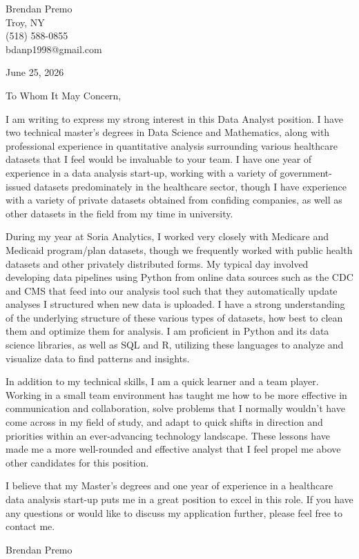 \documentclass[11pt]{article}
\begin{document}
\noindent
Brendan Premo \\
Troy, NY \\
(518) 588-0855 \\
bdanp1998@gmail.com

\vspace{1em}

\noindent
June 25, 2026

\vspace{1em}

\noindent
To Whom It May Concern,

\vspace{0.5em}


I am writing to express my strong interest in this Data Analyst position. 
I have two technical master's degrees in Data Science and Mathematics, along with professional experience in quantitative analysis 
surrounding various healthcare datasets that I feel would be invaluable to your team. I have one year of experience in a data analysis start-up, 
working with a variety of government-issued datasets predominately in the healthcare sector, though I have experience with a variety of private
datasets obtained from confiding companies, as well as other datasets in the field from my time in university.

During my year at Soria Analytics, I worked very closely with Medicare and Medicaid program/plan datasets, though we frequently worked with 
public health datasets and other privately distributed forms. My typical day involved developing data pipelines using Python from online data sources such 
as the CDC and CMS that feed into our analysis tool such that they automatically update analyses I structured when new data is uploaded. I have 
a strong understanding of the underlying structure of these various types of datasets, how best to clean them and optimize them for analysis.
I am proficient in Python and its data science libraries, as well as SQL and R, utilizing these languages to analyze and visualize data to find 
patterns and insights.

In addition to my technical skills, I am a quick learner and a team player. Working in a small team environment has taught me how to be more 
effective in communication and collaboration, solve problems that I normally wouldn't have come across in my field of study, and adapt to quick shifts
in direction and priorities within an ever-advancing technology landscape. These lessons have made me a more well-rounded and effective analyst that I 
feel propel me above other candidates for this position.

I believe that my Master's degrees and one year of experience in a healthcare data analysis start-up puts me in a great position to excel in this role.
If you have any questions or would like to discuss my application further, please feel free to contact me.

\vspace{2em}

\noindent
Brendan Premo
\end{document}
